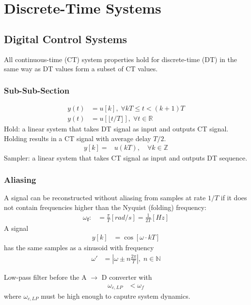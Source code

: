 \section{Discrete-Time Systems}
\subsection{Digital Control Systems}
All continuous-time (CT) system properties hold for discrete-time (DT) in the same way as DT values form a subset of CT values.
\subsubsection{Sub-Sub-Section}
\noindent\begin{align*}
    y(t) & =u[k], \; \forall kT \le t < (k+1)T                 \\
    y(t) & =u[\lfloor t/T\rfloor], \; \forall t \in \mathbb{R}
\end{align*}
Hold: a linear system that takes DT signal as input and outputs CT signal.\\
Holding results in a CT signal with average delay $T/2$.
\noindent\begin{align*}
    y[k]= & u(kT),\quad\forall k\in\mathbb{Z}
\end{align*}
Sampler: a linear system that takes CT signal as input and outputs DT sequence.\\
\subsubsection{Aliasing}

A signal can be reconstructed without aliasing from samples at rate $1/T$ if it does not contain frequencies higher than the Nyquist (folding) frequency:
\noindent\begin{align*}
    \omega_{\mathbf{f}}: & =\frac\pi T[rad/s]=\frac1{2T}[Hz]
\end{align*}
A signal
\noindent\begin{align*}
    y[k] & =\cos[\omega\cdot kT]
\end{align*}
has the same samples as a sinusoid with frequency
\noindent\begin{align*}
    \omega' & =\left|\omega\pm n\frac{2\pi}{T}\right|,\; n\in\mathbb{N}
\end{align*}
%

Low-pass filter before the A $\rightarrow$ D converter with
\noindent\begin{align*}
    \omega_{c,LP} & < \omega_f
\end{align*}
where $\omega_{c,LP}$ must be high enough to caputre system dynamics.
%
%
